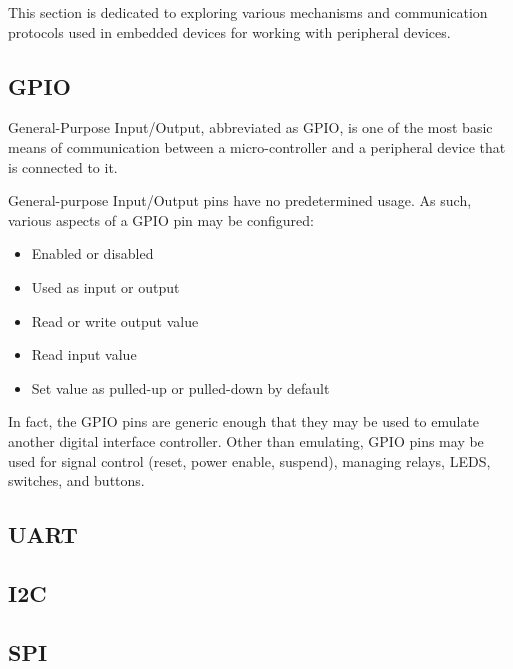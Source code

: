 This section is dedicated to exploring various mechanisms and communication protocols used in embedded devices for working with peripheral devices.

\subsection{GPIO}
General-Purpose Input/Output, abbreviated as GPIO, is one of the most basic means of communication between a micro-controller and a peripheral device that is connected to it.

General-purpose Input/Output pins have no predetermined usage. As such, various aspects of a GPIO pin may be configured:\cite{giometti2017gnu}
\begin{itemize}
    \item Enabled or disabled
    \item Used as input or output
    \item Read or write output value
    \item Read input value
    \item Set value as pulled-up or pulled-down by default
\end{itemize}

In fact, the GPIO pins are generic enough that they may be used to emulate another digital interface controller. Other than emulating, GPIO pins may be used for signal control (reset, power enable, suspend), managing relays, LEDS, switches, and buttons.\cite{giometti2017gnu}

\subsection{UART}

\subsection{I2C}

\subsection{SPI}